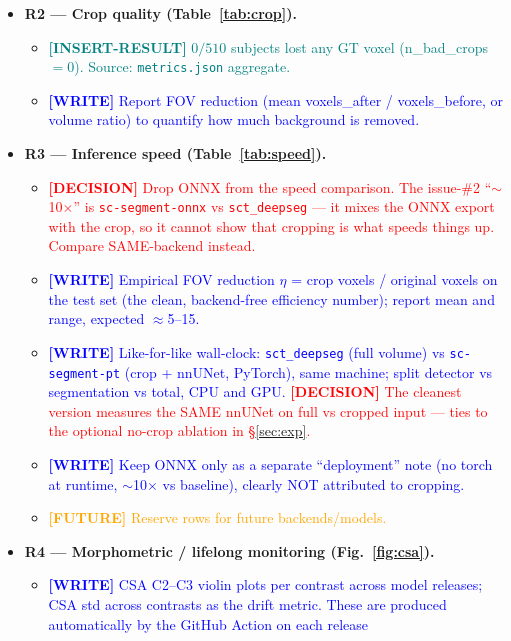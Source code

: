 \documentclass[11pt]{article}
\newcommand{\WRITE}[1]{\textcolor{blue}{\textbf{[WRITE]} #1}}
\newcommand{\RESULT}[1]{\textcolor{teal}{\textbf{[INSERT-RESULT]} #1}}
\newcommand{\FUTURE}[1]{\textcolor{orange}{\textbf{[FUTURE]} #1}}
\newcommand{\DECISION}[1]{\textcolor{red}{\textbf{[DECISION]} #1}}
\begin{document}
\begin{itemize}
  \item \textbf{R2 — Crop quality (Table~\ref{tab:crop}).}
    \begin{itemize}
      \item \RESULT{$0/510$ subjects lost any GT voxel (n\_bad\_crops $=0$).
            Source: \texttt{metrics.json} aggregate.}
      \item \WRITE{Report FOV reduction (mean voxels\_after / voxels\_before, or
            volume ratio) to quantify how much background is removed.}
    \end{itemize}
  \item \textbf{R3 — Inference speed (Table~\ref{tab:speed}).}
    \begin{itemize}
      \item \DECISION{Drop ONNX from the speed comparison. The issue-\#2
            ``$\sim$10$\times$'' is \texttt{sc-segment-onnx} vs
            \texttt{sct\_deepseg} --- it mixes the ONNX export with the crop, so
            it cannot show that cropping is what speeds things up. Compare
            SAME-backend instead.}
      \item \WRITE{Empirical FOV reduction $\eta$ = crop voxels / original
            voxels on the test set (the clean, backend-free efficiency number);
            report mean and range, expected $\approx$5--15.}
      \item \WRITE{Like-for-like wall-clock: \texttt{sct\_deepseg} (full volume)
            vs \texttt{sc-segment-pt} (crop + nnUNet, PyTorch), same machine;
            split detector vs segmentation vs total, CPU and GPU. \DECISION{The
            cleanest version measures the SAME nnUNet on full vs cropped input
            --- ties to the optional no-crop ablation in \S\ref{sec:exp}.}}
      \item \WRITE{Keep ONNX only as a separate ``deployment'' note (no torch at
            runtime, $\sim$10$\times$ vs baseline), clearly NOT attributed to
            cropping.}
      \item \FUTURE{Reserve rows for future backends/models.}
    \end{itemize}
  \item \textbf{R4 — Morphometric / lifelong monitoring (Fig.~\ref{fig:csa}).}
    \begin{itemize}
      \item \WRITE{CSA C2--C3 violin plots per contrast across model releases;
            CSA std across contrasts as the drift metric. These are produced
            automatically by the GitHub Action on each release
}
\end{itemize}
\end{itemize}
\end{document}
